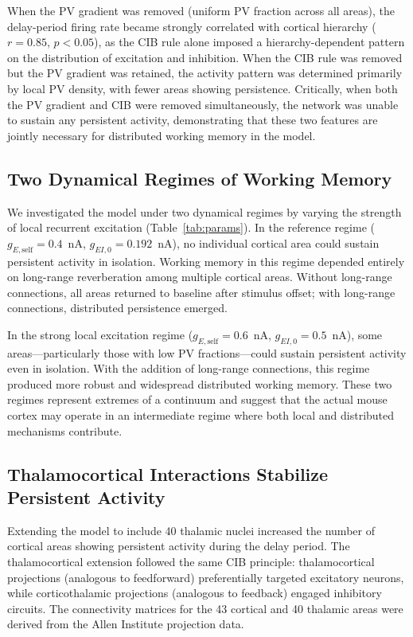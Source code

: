 \documentclass[11pt]{article}
\begin{document}
When the PV gradient was removed (uniform PV fraction across all areas), the delay-period firing rate became strongly correlated with cortical hierarchy ($r = 0.85$, $p < 0.05$), as the CIB rule alone imposed a hierarchy-dependent pattern on the distribution of excitation and inhibition. When the CIB rule was removed but the PV gradient was retained, the activity pattern was determined primarily by local PV density, with fewer areas showing persistence. Critically, when both the PV gradient and CIB were removed simultaneously, the network was unable to sustain any persistent activity, demonstrating that these two features are jointly necessary for distributed working memory in the model.

\subsection{Two Dynamical Regimes of Working Memory}

We investigated the model under two dynamical regimes by varying the strength of local recurrent excitation (Table~\ref{tab:params}). In the reference regime ($g_{E,\text{self}} = 0.4$~nA, $g_{EI,0} = 0.192$~nA), no individual cortical area could sustain persistent activity in isolation. Working memory in this regime depended entirely on long-range reverberation among multiple cortical areas. Without long-range connections, all areas returned to baseline after stimulus offset; with long-range connections, distributed persistence emerged.

In the strong local excitation regime ($g_{E,\text{self}} = 0.6$~nA, $g_{EI,0} = 0.5$~nA), some areas---particularly those with low PV fractions---could sustain persistent activity even in isolation. With the addition of long-range connections, this regime produced more robust and widespread distributed working memory. These two regimes represent extremes of a continuum and suggest that the actual mouse cortex may operate in an intermediate regime where both local and distributed mechanisms contribute.

\subsection{Thalamocortical Interactions Stabilize Persistent Activity}

Extending the model to include 40 thalamic nuclei increased the number of cortical areas showing persistent activity during the delay period. The thalamocortical extension followed the same CIB principle: thalamocortical projections (analogous to feedforward) preferentially targeted excitatory neurons, while corticothalamic projections (analogous to feedback) engaged inhibitory circuits. The connectivity matrices for the 43 cortical and 40 thalamic areas were derived from the Allen Institute projection data.
\end{document}
